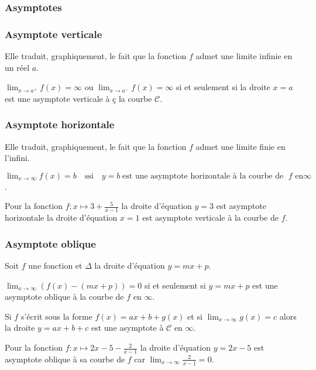 \subsubsection{Asymptotes}
\subsubsection*{Asymptote verticale}
Elle traduit, graphiquement, le fait que la fonction $f$ admet une limite infinie en un réel $a$.


\begin{definition}
$\displaystyle\lim_{x \to a^{+}}f(x)=\infty$  ou 
$\displaystyle\lim_{x \to a^{-}}f(x)=\infty$ si et seulement si la droite  $x=a$ est une asymptote verticale à    ç la courbe $\mathcal{C} $.
\end{definition}



\subsubsection*{Asymptote horizontale}
Elle traduit, graphiquement, le fait que la fonction $f$ admet une limite finie en l'infini.



\begin{definition}
$\displaystyle \lim_{x \to \infty}f(x)=b \quad \text{ssi} \quad y = b \;  \text{est une  asymptote horizontale à  la courbe de }\; f \text{ en}  \infty$.
\end{definition}

\begin{example}
Pour la fonction $f : x\mapsto 3+ \frac{5}{x-1} $ 
la droite d'équation   $y = 3 $ est asymptote horizontale  la droite d'équation $x = 1$ est asymptote verticale à la courbe de $f.$

\end{example}

\subsubsection*{Asymptote oblique}
\begin{definition}
Soit $f$ une fonction et $ \Delta $ la droite d'équation  $y=mx+p$.

$\displaystyle \lim_{x \to \infty}\left(f(x)-(mx+p)\right)=0$   si et seulement si    $y=mx+p$  est une  asymptote oblique  à la courbe de $f$ en  $\infty$.
\end{definition}

\begin{remark} 
Si $ f $ s'écrit sous la forme $ f(x)= ax+b + g(x) $ et si $ \displaystyle \lim_{x \to \infty}g(x)=c $  alors la droite $ y=ax+b+c $ est une asymptote à  $ \mathcal{C} $ en $ \infty. $
\end{remark}
\begin{example}
Pour la fonction $f : x\mapsto 2x-5- \frac{2}{x-1} $ 
la droite d'équation   $y = 2x-5 $ est asymptote oblique à sa courbe de $f$ car  $\displaystyle \lim_{x \to \infty}\frac{2}{x-1}=0$.
\end{example}

